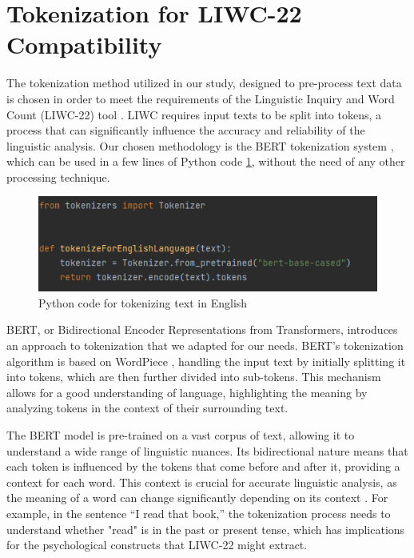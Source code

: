 \section{Tokenization for LIWC-22 Compatibility}

\quad The tokenization method utilized in our study, designed to pre-process text data is chosen in order to meet the requirements of the Linguistic Inquiry and Word Count (LIWC-22) tool \cite{boyd2022development}. LIWC requires input texts to be split into tokens, a process that can significantly influence the accuracy and reliability of the linguistic analysis. Our chosen methodology is the BERT tokenization system \cite{bertTokenizerEnglish}, which can be used in a few lines of Python code \ref{codeTokenizeEN}, without the need of any other processing technique.


\begin{figure}[htbp]
	\centering
		\includegraphics[scale=1]{LaTeX Bachelor Thesis Depression Signs Detection/figures/codeTokenizeEn.png}
	\caption{Python code for tokenizing text in English}
	\label{codeTokenizeEN}
\end{figure}

BERT, or Bidirectional Encoder Representations from Transformers, introduces an approach to tokenization that we adapted for our needs. BERT’s tokenization algorithm is based on WordPiece \cite{wu2016google}, handling the input text by initially splitting it into tokens, which are then further divided into sub-tokens. This mechanism allows for a good understanding of language, highlighting the meaning by analyzing tokens in the context of their surrounding text.

The BERT model is pre-trained on a vast corpus of text, allowing it to understand a wide range of linguistic nuances. Its bidirectional nature means that each token is influenced by the tokens that come before and after it, providing a context for each word. This context is crucial for accurate linguistic analysis, as the meaning of a word can change significantly depending on its context \cite{bertTokenizerEnglish}. For example, in the sentence “I read that book,” the tokenization process needs to understand whether "read" is in the past or present tense, which has implications for the psychological constructs that LIWC-22 might extract.

